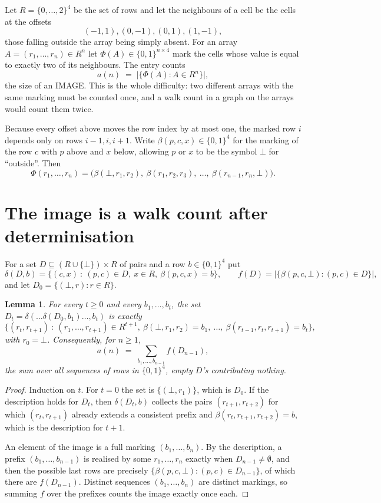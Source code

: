 \documentclass[11pt,a4paper]{article}
\theoremstyle{plain}
\newtheorem{lemma}[theorem]{Lemma}
\theoremstyle{definition}
\begin{document}
Let $R=\{0,\dots,2\}^{4}$ be the set of rows and let the neighbours of a cell be the
cells at the offsets
\[
(-1,1), (0,-1), (0,1), (1,-1),
\]
those falling outside the array being simply absent. For an array
$A=(r_1,\dots,r_n)\in R^n$ let $\Phi(A)\in\{0,1\}^{n\times4}$ mark the cells whose value
is equal to exactly two of its neighbours. The entry counts
\[
a(n)\;=\;\bigl|\{\Phi(A):A\in R^n\}\bigr| ,
\]
the size of an IMAGE. This is the whole difficulty: two different arrays with the same marking
must be counted once, and a walk count in a graph on the arrays would count them twice.

Because every offset above moves the row index by at most one, the marked row $i$ depends only
on rows $i-1,i,i+1$. Write $\beta(p,c,x)\in\{0,1\}^{4}$ for the marking of the row $c$
with $p$ above and $x$ below, allowing $p$ or $x$ to be the symbol $\bot$ for ``outside''.
Then
\[
\Phi(r_1,\dots,r_n)=\bigl(\beta(\bot,r_1,r_2),\ \beta(r_1,r_2,r_3),\ \dots,\
\beta(r_{n-1},r_n,\bot)\bigr).
\]

\section{The image is a walk count after determinisation}

For a set $D\subseteq(R\cup\{\bot\})\times R$ of pairs and a row $b\in\{0,1\}^{4}$ put
\[
\delta(D,b)=\{(c,x)\ :\ (p,c)\in D,\ x\in R,\ \beta(p,c,x)=b\},\qquad
f(D)=\bigl|\{\beta(p,c,\bot):(p,c)\in D\}\bigr| ,
\]
and let $D_0=\{(\bot,r):r\in R\}$.

\begin{lemma}\label{lem:det}
For every $t\ge0$ and every $b_1,\dots,b_t$, the set
$D_t=\delta(\dots\delta(D_0,b_1)\dots,b_t)$ is exactly
\[
\{(r_t,r_{t+1})\ :\ (r_1,\dots,r_{t+1})\in R^{t+1},\ \beta(\bot,r_1,r_2)=b_1,\ \dots,\
\beta(r_{t-1},r_t,r_{t+1})=b_t\} ,
\]
with $r_0=\bot$. Consequently, for $n\ge1$,
\[
a(n)\;=\;\sum_{b_1,\dots,b_{n-1}}f(D_{n-1}),
\]
the sum over all sequences of rows in $\{0,1\}^{4}$, empty $D$'s contributing nothing.
\end{lemma}

\begin{proof}
Induction on $t$. For $t=0$ the set is $\{(\bot,r_1)\}$, which is $D_0$. If the description
holds for $D_t$, then $\delta(D_t,b)$ collects the pairs $(r_{t+1},r_{t+2})$ for which
$(r_t,r_{t+1})$ already extends a consistent prefix and
$\beta(r_t,r_{t+1},r_{t+2})=b$, which is the description for $t+1$.

An element of the image is a full marking $(b_1,\dots,b_n)$. By the description, a prefix
$(b_1,\dots,b_{n-1})$ is realised by some $r_1,\dots,r_n$ exactly when $D_{n-1}\neq
\emptyset$, and then the possible last rows are precisely
$\{\beta(p,c,\bot):(p,c)\in D_{n-1}\}$, of which there are $f(D_{n-1})$. Distinct
sequences $(b_1,\dots,b_n)$ are distinct markings, so summing $f$ over the prefixes counts the
image exactly once each.
\end{proof}
\end{document}
